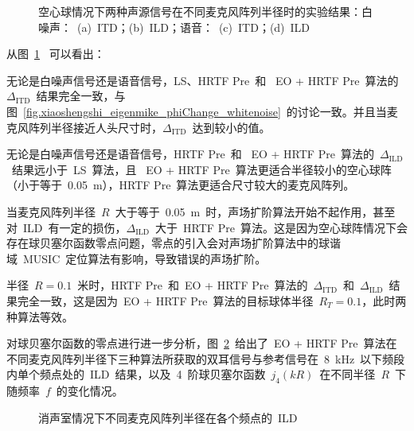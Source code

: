 \begin{figure}[!h]
\centering
{}
\hfill
{}
\vfill
{}
\caption{空心球情况下两种声源信号在不同麦克风阵列半径时的实验结果：白噪声：~(a)~ITD；(b)~ILD；语音：~(c)~ITD；(d)~ILD}
\label{fig.xiaoshengshi_eigenmike_r_eigChange_whitenoise}
\end{figure}

从图~\ref{fig.xiaoshengshi_eigenmike_r_eigChange_whitenoise} ~可以看出：
\begin{inparaenum}[（1）]

\item 无论是白噪声信号还是语音信号，LS、HRTF Pre~和~ EO + HRTF Pre~算法的~$\Delta_{\text{ITD}}$~结果完全一致，与图~\ref{fig.xiaoshengshi_eigenmike_phiChange_whitenoise}~的讨论一致。并且当麦克风阵列半径接近人头尺寸时，$\Delta_{\text{ITD}}$~达到较小的值。

\item 无论是白噪声信号还是语音信号，HRTF Pre~和~ EO + HRTF Pre~算法的~$\Delta_{\text{ILD}}$~结果远小于~LS~算法，且~ EO + HRTF Pre~算法更适合半径较小的空心球阵（小于等于~0.05~m），HRTF Pre~算法更适合尺寸较大的麦克风阵列。

\item 当麦克风阵列半径~$R$~大于等于~0.05~m~时，声场扩阶算法开始不起作用，甚至对~ILD~有一定的损伤，$\Delta_{\text{ILD}}$~大于~HRTF Pre~算法。这是因为空心球阵情况下会存在球贝塞尔函数零点问题，零点的引入会对声场扩阶算法中的球谐域~MUSIC~定位算法有影响，导致错误的声场扩阶。

\item 半径~$R=0.1$~米时，HRTF Pre~和~EO + HRTF Pre~算法的~$\Delta_{\text{ITD}}$~和~$\Delta_{\text{ILD}}$~结果完全一致，这是因为~EO + HRTF Pre~算法的目标球体半径~$R_{T}=0.1$，此时两种算法等效。

\end{inparaenum}

对球贝塞尔函数的零点进行进一步分析，图~\ref{fig.xiaoshengshi_r_eig_bessel_zero}~给出了~EO + HRTF Pre~算法在不同麦克风阵列半径下三种算法所获取的双耳信号与参考信号在~8~kHz~以下频段内单个频点处的~ILD~结果，以及~4~阶球贝塞尔函数~$j_{4}(kR)$~在不同半径~$R$~下随频率~$f$~的变化情况。

\begin{figure}[H]
\centering
{}
\hfill
{}
\caption{消声室情况下不同麦克风阵列半径在各个频点的~ILD~}
\label{fig.xiaoshengshi_r_eig_bessel_zero}
\end{figure}

